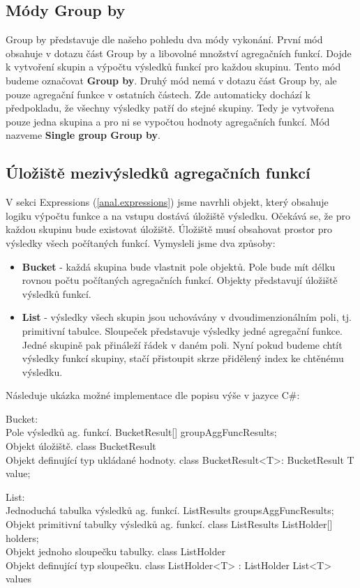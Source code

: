 \subsection{Módy Group by}

Group by představuje dle našeho pohledu dva módy vykonání.
První mód obsahuje v dotazu část Group by a libovolné množství agregačních funkcí.
Dojde k vytvoření skupin a výpočtu výsledků funkcí pro každou skupinu.
Tento mód budeme označovat \textbf{Group by}.
Druhý mód nemá v dotazu část Group by, ale pouze agregační funkce v ostatních částech.
Zde automaticky dochází k předpokladu, že všechny výsledky patří do stejné skupiny.
Tedy je vytvořena pouze jedna skupina a pro ni se vypočtou hodnoty agregačních funkcí.
Mód nazveme \textbf{Single group Group by}.


\subsection{Úložiště mezivýsledků agregačních funkcí} \label{anal.groupby.uloziste}

V sekci Expressions (\ref{anal.expressions}) jsme navrhli objekt, který obsahuje logiku výpočtu funkce a na vstupu dostává úložiště výsledku.
Očekává se, že pro každou skupinu bude existovat úložiště.
Úložiště musí obsahovat prostor pro výsledky všech počítaných funkcí.
Vymysleli jsme dva způsoby:

\begin{itemize}

\item \textbf{Bucket} - každá skupina bude vlastnit pole objektů. 
Pole bude mít délku rovnou počtu počítaných agregačních funkcí.
Objekty představují úložiště výsledků funkcí.

\item \textbf{List} - výsledky všech skupin jsou uchovávány v dvoudimenzionálním poli, tj. primitivní tabulce.
Sloupeček představuje výsledky jedné agregační funkce.
Jedné skupině pak přináleží řádek v daném poli.
Nyní pokud budeme chtít výsledky funkcí skupiny, stačí přistoupit skrze přidělený index ke chtěnému výsledku.
\end{itemize}

Následuje ukázka možné implementace dle popisu výše v jazyce C\#:
\begin{code}
Bucket:
\\ Pole výsledků ag. funkcí.
BucketResult[] groupAggFuncResults; 
\\ Objekt úložiště. 
class BucketResult {} 
\\ Objekt definující typ ukládané hodnoty.
class BucketResult<T>: BucketResult { T value; }

List:
\\ Jednoduchá tabulka výsledků ag. funkcí.
ListResults groupsAggFuncResults;
\\ Objekt primitivní tabulky výsledků ag. funkcí.
class ListResults { ListHolder[] holders; }
\\ Objekt jednoho sloupečku tabulky.
class ListHolder {}
\\ Objekt definující typ sloupečku.
class ListHolder<T> : ListHolder { List<T> values }
\end{code}

